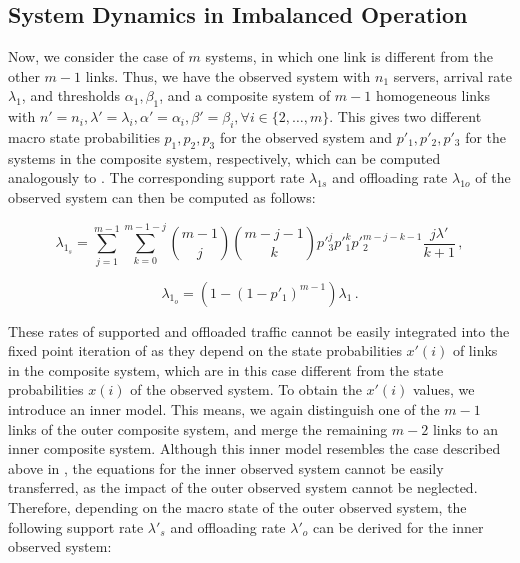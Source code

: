\subsection{System Dynamics in Imbalanced Operation}\label{sec:aggregation:imbalanced:analytical_model}



Now, we consider the case of $m$ systems, in which one link is different from the other $m-1$ links. Thus, we have the observed system with $n_1$ servers, arrival rate $\lambda_1$, and thresholds $\alpha_1, \beta_1$, and a composite system of $m-1$ homogeneous links with $n'=n_i, \lambda'=\lambda_i, \alpha'=\alpha_i, \beta'=\beta_i, \forall i\in\{2,\ldots,m\}$. This gives two different macro state probabilities $p_1, p_2, p_3$ for the observed system and $p'_1, p'_2, p'_3$ for the systems in the composite system, respectively, which can be computed analogously to . The corresponding support rate $\lambda_{1s}$ and offloading rate $\lambda_{1o}$ of the observed system can then be computed as follows:

\begin{equation}
\lambda_{1_s} = \sum_{j=1}^{m-1}\sum_{k=0}^{m-1-j} \binom{m-1}{j}\binom{m-j-1}{k}p'^j_3 p'^k_1 p'^{m-j-k-1}_2\frac{j\lambda'}{k+1} \, ,
\end{equation}

\begin{equation}
\lambda_{1_o} = (1-(1-p'_1)^{m-1})\lambda_1 \, .
\end{equation}

These rates of supported and offloaded traffic cannot be easily integrated into the fixed point iteration of  as they depend on the state probabilities $x'(i)$ of links in the composite system, which are in this case different from the state probabilities $x(i)$ of the observed system.
To obtain the $x'(i)$ values, we introduce an inner model.
This means, we again distinguish one of the $m-1$ links of the outer composite system, and merge the remaining $m-2$ links to an inner composite system. Although this inner model resembles the case described above in , the equations for the inner observed system cannot be easily transferred, as the impact of the outer observed system cannot be neglected. Therefore, depending on the macro state of the outer observed system, the following support rate $\lambda'_s$ and offloading rate $\lambda'_o$ can be derived for the inner observed system:

